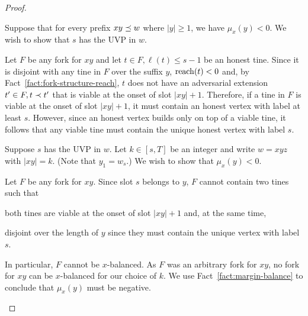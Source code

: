 \begin{proof}~

  \begin{description}[font=\normalfont\itshape\space]
    \item[The $\Longleftarrow$ direction.]
      Suppose that 
      for every prefix $xy \preceq w$ where $|y| \geq 1$, 
      we have $\mu_x(y) < 0$. 
      We wish to show that $s$ has the UVP in $w$.

      Let $F$ be any fork for $xy$ 
      and let 
      $t \in F, \ell(t) \leq s - 1$ be an honest tine. 
      Since it is disjoint with any tine in $F$ over the suffix $y$, 
      $\operatorname{reach}(t) < 0$ and, by Fact~\ref{fact:fork-structure-reach}, 
      $t$ does not have an adversarial extension $t' \in F, t \prec t'$ that is 
      viable at the onset of slot $|xy| + 1$. 
      Therefore, if a tine in $F$ 
      is viable at the onset of slot $|xy| + 1$, 
      it must contain an honest vertex with label at least $s$. 
      However, since an honest vertex builds only on top of a viable tine, 
      it follows that any viable tine must contain 
      the unique honest vertex with label $s$.

    \item[The $\Longrightarrow$ direction.]
      Suppose $s$ has the UVP in $w$.
      Let $k \in [s, T]$ be an integer and 
      write $w = xyz$ with $|xy| = k$. 
      (Note that $y_1 = w_s$.)
      We wish to show that $\mu_x(y) < 0$.

      Let $F$ be any fork for $xy$.
      Since slot $s$ belongs to $y$, 
      $F$ cannot contain two tines 
      such that 
      \begin{enumerate*}[label=(\roman*)]
        \item both tines are viable at the onset of slot $|xy| + 1$ 
        and, at the same time, 
        \item disjoint over the length of $y$ 
        since they must contain the unique vertex with label $s$. 
      \end{enumerate*}
      In particular, 
      $F$ cannot be $x$-balanced. 
      As $F$ was an arbitrary fork for $xy$, 
      no fork for $xy$ can be $x$-balanced for our choice of $k$.
      We use Fact~\ref{fact:margin-balance} 
      to conclude that 
      $\mu_x(y)$ must be negative.

  \end{description}
\end{proof}
